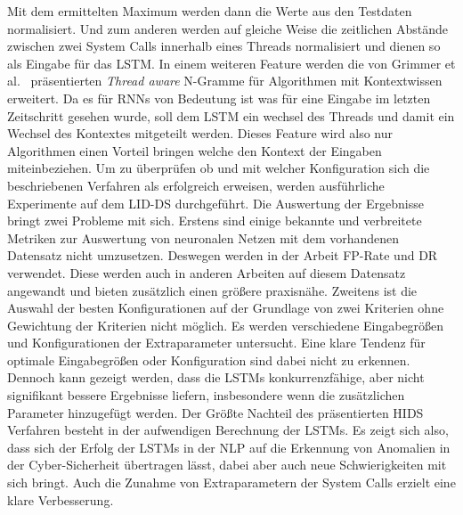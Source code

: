 Mit dem ermittelten Maximum werden dann die Werte aus den Testdaten normalisiert.
Und zum anderen werden auf gleiche Weise die zeitlichen Abstände zwischen zwei System Calls innerhalb eines Threads normalisiert und dienen so als Eingabe für das \ac{LSTM}.
In einem weiteren Feature werden die von Grimmer et al.~\cite{IDSTHREADGRIMMER2021} präsentierten \textit{Thread aware} N-Gramme für Algorithmen mit Kontextwissen erweitert.
Da es für \acp{RNN} von Bedeutung ist was für eine Eingabe im letzten Zeitschritt gesehen wurde, soll dem \ac{LSTM} ein wechsel des Threads und damit ein Wechsel des Kontextes mitgeteilt werden.
Dieses Feature wird also nur Algorithmen einen Vorteil bringen welche den Kontext der Eingaben miteinbeziehen.
Um zu überprüfen ob und mit welcher Konfiguration sich die beschriebenen Verfahren als erfolgreich erweisen, werden ausführliche Experimente auf dem \ac{LID-DS} durchgeführt.
Die Auswertung der Ergebnisse bringt zwei Probleme mit sich.
Erstens sind einige bekannte und verbreitete Metriken zur Auswertung von neuronalen Netzen mit dem vorhandenen Datensatz nicht umzusetzen.
Deswegen werden in der Arbeit \ac{FP}-Rate und \ac{DR} verwendet. 
Diese werden auch in anderen Arbeiten auf diesem Datensatz angewandt und bieten zusätzlich einen größere praxisnähe.
Zweitens ist die Auswahl der besten Konfigurationen auf der Grundlage von zwei Kriterien ohne Gewichtung der Kriterien nicht möglich.
Es werden verschiedene Eingabegrößen und Konfigurationen der Extraparameter untersucht.
Eine klare Tendenz für optimale Eingabegrößen oder Konfiguration sind dabei nicht zu erkennen.
Dennoch kann gezeigt werden, dass die \acp{LSTM} konkurrenzfähige, aber nicht signifikant bessere Ergebnisse liefern, insbesondere wenn die zusätzlichen Parameter hinzugefügt werden.
Der Größte Nachteil des präsentierten \ac{HIDS} Verfahren besteht in der aufwendigen Berechnung der \acp{LSTM}.
Es zeigt sich also, dass sich der Erfolg der \acp{LSTM} in der \ac{NLP} auf die Erkennung von Anomalien in der Cyber-Sicherheit übertragen lässt, dabei aber auch neue Schwierigkeiten mit sich bringt.
Auch die Zunahme von Extraparametern der System Calls erzielt eine klare Verbesserung.

